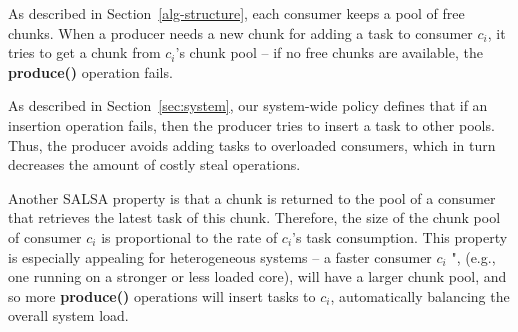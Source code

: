 As described in Section~\ref{alg-structure}, each consumer keeps a pool of free chunks.
When a producer needs a new chunk for adding a task to consumer $c_i$, it tries to get a chunk from $c_i$'s chunk pool -- if no free chunks are available, the {\bf produce()} operation fails.

As described in Section~\ref{sec:system}, our system-wide policy defines that if an insertion operation fails, then the producer tries to insert a task to other pools. Thus, the producer avoids adding tasks to overloaded consumers, which in turn decreases the amount of costly steal operations. 

Another SALSA property is that a chunk is returned to the pool of a consumer that retrieves the latest task of this chunk. 
Therefore, the size of the chunk pool of consumer $c_i$ is proportional to the rate of $c_i$'s task consumption.
This property is especially appealing for heterogeneous systems -- a faster consumer $c_i$ ", (e.g., one running on a stronger or less loaded core), will have a larger chunk pool, and so more {\bf produce()} operations will insert tasks to $c_i$, automatically balancing the overall system load. 

